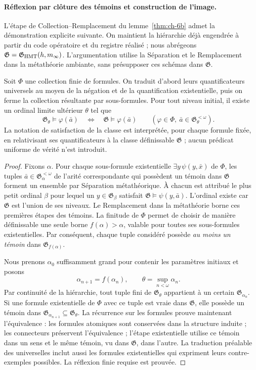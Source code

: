 \paragraph{Réflexion par clôture des témoins et construction de l'image.}
L’étape de Collection--Remplacement du lemme~\ref{thm:ch-6b} admet la
démonstration explicite suivante. On maintient la hiérarchie déjà engendrée à partir du
code opératoire et du registre réalisé ; nous abrégeons
\(\mathfrak G=\mathfrak G_{\rm HMT}(h,m_\infty)\).
L’argumentation utilise la Séparation et le Remplacement dans la métathéorie ambiante,
sans présupposer ces schémas dans \(\mathfrak G\).

Soit \(\Phi\) une collection finie de formules. On traduit d'abord leurs quantificateurs universels au moyen de la négation et de la quantification existentielle, puis on ferme la collection résultante par sous-formules. Pour tout niveau initial, il existe un ordinal limite ultérieur \(\theta\) tel que
\[
 \mathfrak G_\theta\models\varphi(\bar a)
 \quad\Longleftrightarrow\quad
 \mathfrak G\models\varphi(\bar a)
 \qquad
 (\varphi\in\Phi,\ \bar a\in\mathfrak G_\theta^{<\omega}).
\]
La notation de satisfaction de la classe est interprétée, pour chaque formule fixée, en relativisant ses quantificateurs à la classe définissable \(\mathfrak G\) ; aucun prédicat uniforme de vérité n'est introduit.

\begin{proof}
Fixons \(\alpha\). Pour chaque sous-formule existentielle
\(\exists y\,\psi(y,\bar x)\) de \(\Phi\), les tuples
\(\bar a\in\mathfrak G_\alpha^{<\omega}\) de l’arité correspondante
qui possèdent un témoin dans \(\mathfrak G\) forment un ensemble par Séparation
métathéorique. À chacun est attribué le plus petit ordinal \(\beta\) pour lequel
un \(y\in\mathfrak G_\beta\) satisfait
\(\mathfrak G\models\psi(y,\bar a)\). L’ordinal existe car
\(\mathfrak G\) est l’union de ses niveaux. Le Remplacement dans la métathéorie
borne ces premières étapes des témoins. La finitude de \(\Phi\) permet
de choisir de manière définissable une seule borne \(f(\alpha)>\alpha\), valable pour
toutes ses sous-formules existentielles. Par conséquent, chaque tuple considéré possède
\emph{au moins un témoin} dans \(\mathfrak G_{f(\alpha)}\).

Nous prenons \(\alpha_0\) suffisamment grand pour contenir les paramètres
initiaux et posons
\[
 \alpha_{n+1}=f(\alpha_n),\qquad
 \theta=\sup_{n<\omega}\alpha_n.
\]
Par continuité de la hiérarchie, tout tuple fini de
\(\mathfrak G_\theta\) appartient à un certain \(\mathfrak G_{\alpha_n}\).
Si une formule existentielle de \(\Phi\) avec ce tuple est vraie dans
\(\mathfrak G\), elle possède un témoin dans
\(\mathfrak G_{\alpha_{n+1}}\subseteq\mathfrak G_\theta\).
La récurrence sur les formules prouve maintenant l’équivalence : les formules atomiques
sont conservées dans la structure induite ; les connecteurs préservent
l’équivalence ; l’étape existentielle utilise ce témoin dans un sens et le
même témoin, vu dans \(\mathfrak G\), dans l’autre. La traduction préalable
des universelles inclut aussi les formules existentielles qui expriment
leurs contre-exemples possibles. La réflexion finie requise est prouvée.
\end{proof}


